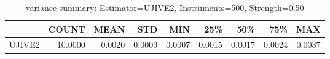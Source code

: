 \begin{table}[ht]
\centering
\caption{variance summary: Estimator=UJIVE2, Instruments=500, Strength=0.50}
\begin{tabular}{lrrrrrrrr}
\toprule
 & COUNT & MEAN & STD & MIN & 25\% & 50\% & 75\% & MAX \\
\midrule
UJIVE2 & 10.0000 & 0.0020 & 0.0009 & 0.0007 & 0.0015 & 0.0017 & 0.0024 & 0.0037 \\
\bottomrule
\end{tabular}
\end{table}
